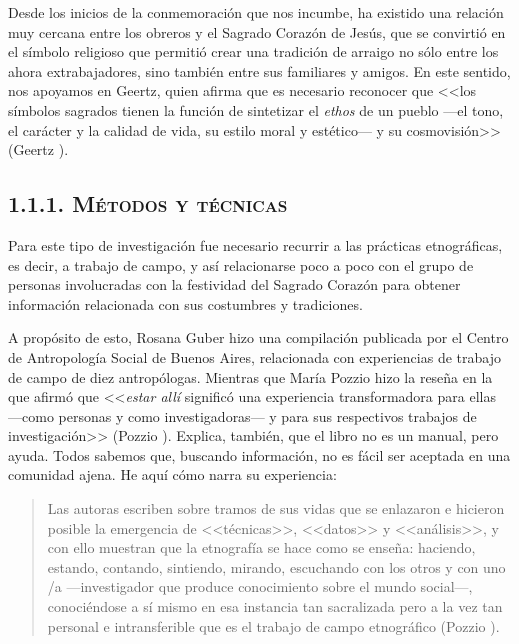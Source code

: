 \documentclass[14pt,letterpaper,twoside]{extbook} %
\begin{document}
Desde los inicios de la conmemoración que nos incumbe, ha existido una relación muy cercana entre los obreros y el Sagrado Corazón de Jesús, que se convirtió en el símbolo religioso que permitió crear una tradición de arraigo no sólo entre los ahora extrabajadores, sino también entre sus familiares y amigos. En este sentido, nos apoyamos en Geertz, quien afirma que es necesario reconocer que <<los símbolos sagrados tienen la función de sintetizar el \textit{ethos} de un pueblo ---el tono, el carácter y la calidad de vida, su estilo moral y estético--- y su cosmovisión>> (Geertz ).

\subsection*{\mdseries\large\textsc{1.1.1. Métodos y técnicas}}

\noindent Para este tipo de investigación fue necesario recurrir a las prácticas etnográficas, es decir, a trabajo de campo, y así relacionarse poco a poco con el grupo de personas involucradas con la festividad del Sagrado Corazón para obtener información relacionada con sus costumbres y tradiciones.

A propósito de esto, Rosana Guber hizo una compilación publicada por el Centro de Antropología Social de Buenos Aires, relacionada con experiencias de trabajo de campo de diez antropólogas. Mientras que María Pozzio hizo la reseña en la que afirmó que <<\textit{estar allí} significó una experiencia transformadora para ellas ---como personas y como investigadoras--- y para sus respectivos trabajos de investigación>> (Pozzio ). Explica, también, que el libro no es un manual, pero ayuda. Todos sabemos que, buscando información, no es fácil ser aceptada en una comunidad ajena. He aquí cómo narra su experiencia:

\begin{quotation}
\noindent Las autoras escriben sobre tramos de sus vidas que se enlazaron e hicieron posible la emergencia de <<técnicas>>, <<datos>> y <<análisis>>, y con ello muestran que la etnografía se hace como se enseña: haciendo, estando, contando, sintiendo, mirando, escuchando con los otros y con uno /a ---investigador que produce conocimiento sobre el mundo social---, conociéndose a sí mismo en esa instancia tan sacralizada pero a la vez tan personal e intransferible que es el trabajo de campo etnográfico (Pozzio ).
\end{quotation}
\end{document}

